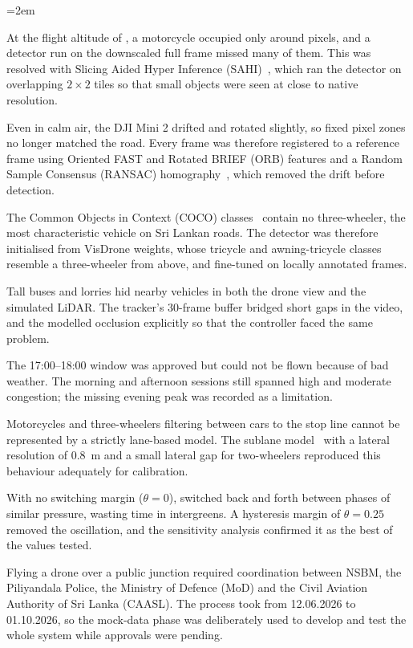 {\emergencystretch=2em
\begin{description}[leftmargin=0pt,style=unboxed]
\item[Tiny motorcycles in aerial video.] At the flight altitude of , a motorcycle occupied only around  pixels, and a detector run on the downscaled full frame missed many of them. This was resolved with Slicing Aided Hyper Inference (SAHI)~\cite{akyon2022sahi}, which ran the detector on overlapping $2\times2$ tiles so that small objects were seen at close to native resolution.
\item[Drone hover drift.] Even in calm air, the DJI Mini 2 drifted and rotated slightly, so fixed pixel zones no longer matched the road. Every frame was therefore registered to a reference frame using Oriented FAST and Rotated BRIEF (ORB) features and a Random Sample Consensus (RANSAC) homography~\cite{rublee2011orb,fischler1981ransac}, which removed the drift before detection.
\item[Three-wheelers absent from standard datasets.] The Common Objects in Context (COCO) classes~\cite{lin2014coco} contain no three-wheeler, the most characteristic vehicle on Sri Lankan roads. The detector was therefore initialised from VisDrone weights, whose tricycle and awning-tricycle classes~\cite{zhu2022visdrone} resemble a three-wheeler from above, and fine-tuned on  locally annotated frames.
\item[Occlusion by buses.] Tall buses and lorries hid nearby vehicles in both the drone view and the simulated LiDAR. The tracker's 30-frame buffer bridged short gaps in the video, and the \vls{} modelled occlusion explicitly so that the controller faced the same problem.
\item[Lost evening session.] The 17:00--18:00 window was approved but could not be flown because of bad weather. The morning and afternoon sessions still spanned high and moderate congestion; the missing evening peak was recorded as a limitation.
\item[Lane-less filtering in \sumo{}.] Motorcycles and three-wheelers filtering between cars to the stop line cannot be represented by a strictly lane-based model. The sublane model~\cite{sumo_sublane} with a lateral resolution of 0.8~m and a small lateral gap for two-wheelers reproduced this behaviour adequately for calibration.
\item[Phase oscillation.] With no switching margin ($\theta=0$), \prism{} switched back and forth between phases of similar pressure, wasting time in intergreens. A hysteresis margin of $\theta=0.25$ removed the oscillation, and the sensitivity analysis confirmed it as the best of the values tested.
\item[Permission lead time.] Flying a drone over a public junction required coordination between NSBM, the Piliyandala Police, the Ministry of Defence (MoD) and the Civil Aviation Authority of Sri Lanka (CAASL). The process took from 12.06.2026 to 01.10.2026, so the mock-data phase was deliberately used to develop and test the whole system while approvals were pending.
\end{description}}

